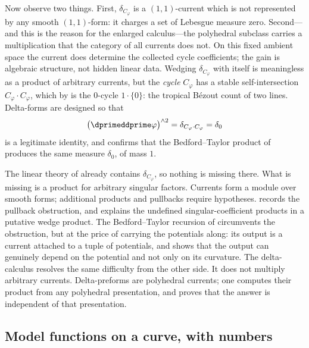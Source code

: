\begin{example}
Now observe two things.  First, $\delta_{C_\varphi}$ is a $(1,1)$-current
which is not represented by any smooth $(1,1)$-form: it charges a set of
Lebesgue measure zero.  Second---and this is the reason for the enlarged
calculus---the polyhedral subclass carries a multiplication that the
category of all currents does not.  On this fixed ambient space the current
does determine the collected cycle coefficients; the gain is algebraic
structure, not hidden linear data.  Wedging $\delta_{C_\varphi}$ with itself
is meaningless as a product of arbitrary currents, but the \emph{cycle}
$C_\varphi$ has a stable
self-intersection $C_\varphi\cdot C_\varphi$, which by
 is the $0$-cycle $1\cdot\{0\}$: the
tropical B\'ezout count of two lines.  Delta-forms are designed so that
\[
 \bigl(\dprimeddprime\varphi\bigr)^{\wedge2}=\delta_{C_\varphi\cdot C_\varphi}
 =\delta_0
\]
is a legitimate identity, and  confirms that the
Bedford--Taylor product of  produces the same
measure $\delta_0$, of mass $1$.
\end{example}

\begin{remark}
\label{rem:ch18-why-not-currents}
The linear theory of  already contains
$\delta_{C_\varphi}$, so nothing is missing there.  What is missing is a
product for arbitrary singular factors.  Currents form a module over smooth
forms; additional products and pullbacks require hypotheses.
 records the pullback obstruction, and
 explains the undefined singular-coefficient
products in a putative wedge product.  The Bedford--Taylor recursion of
 circumvents the obstruction, but at the price
of carrying the potentials along: its output is a current attached to a
tuple of potentials, and  shows that the output can
genuinely depend on the potential and not only on its curvature.  The
delta-calculus resolves the same difficulty from the other side.  It does
not multiply arbitrary currents.  Delta-preforms are polyhedral currents;
one computes their product from any polyhedral presentation, and
 proves that the answer is independent of
that presentation.
\end{remark}

\subsection{Model functions on a curve, with numbers}
\label{sec:ch18-defect-model}

